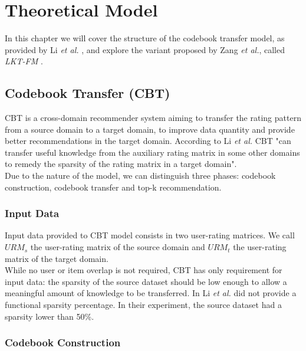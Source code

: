 \chapter{Theoretical Model}
\label{theoretical-model}

In this chapter we will cover the structure of the codebook transfer model, as provided by Li \textit{et al.} \cite{10.5555/1661445.1661773}, and explore the variant proposed by Zang \textit{et al.}, called \textit{LKT-FM} \cite{10.1007/978-3-319-71246-8_39}.


\section{Codebook Transfer (CBT)}

CBT is a cross-domain recommender system aiming to transfer the rating pattern from a source domain to a target domain, to improve data quantity and provide better recommendations in the target domain. According to Li \textit{et al.} \cite{10.5555/1661445.1661773} CBT "can transfer useful knowledge from the auxiliary rating matrix in some other domains to remedy the sparsity of the rating matrix in a target domain".\\
Due to the nature of the model, we can distinguish three phases: codebook construction, codebook transfer and top-k recommendation.


\subsection{Input Data}

Input data provided to CBT model consists in two user-rating matrices. We call $URM_s$ the user-rating matrix of the source domain and $URM_t$ the user-rating matrix of the target domain.\\
While no user or item overlap is not required, CBT has only requirement for input data: the sparsity of the source dataset should be low enough to allow a meaningful amount of knowledge to be transferred. In \cite{10.5555/1661445.1661773} Li \textit{et al.} did not provide a functional sparsity percentage. In their experiment, the source dataset had a sparsity lower than 50\%.


\subsection{Codebook Construction}


